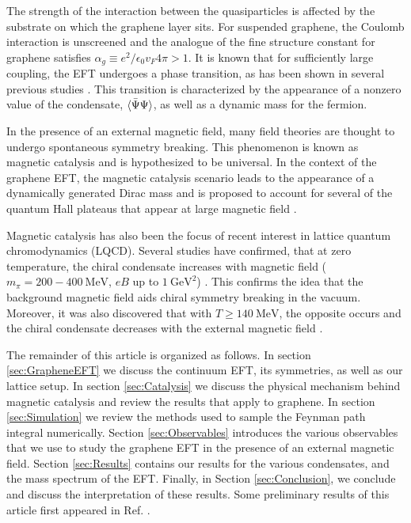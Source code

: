 \documentclass[aps,prd,twocolumn,showpacs,superscriptaddress,groupedaddress]{revtex4}  %
\begin{document}
The strength of the interaction between the quasiparticles is affected by the substrate on which the graphene layer sits. For suspended graphene, the Coulomb interaction is unscreened
and the analogue of the fine structure constant for graphene satisfies $\alpha_g \equiv e^2/\epsilon_0 v_F 4\pi > 1$. It is known that for sufficiently large coupling, the EFT undergoes a phase transition, as has been shown in 
several previous studies \cite{Drut1, Drut2, Hands1, Hands2}. This transition is characterized by the appearance of a nonzero value of the condensate, ${\langle {\bar \Psi} \Psi \rangle}$, as well as a dynamic mass
for the fermion.

In the presence of an external magnetic field, many field theories are thought to undergo spontaneous symmetry breaking. This phenomenon is known as magnetic catalysis and is hypothesized to be universal. In the context of the graphene EFT, the magnetic
catalysis scenario leads to the appearance of a dynamically generated Dirac mass and is proposed to account for several of the quantum Hall plateaus that appear at large magnetic field \cite{ZhangQHE,JiangQHE}.

Magnetic catalysis has also been the focus of recent interest in lattice quantum chromodynamics (LQCD). Several studies have confirmed, that at zero temperature, the chiral condensate
increases with magnetic field ($m_{\pi} = 200-400 ~\text{MeV}$, $eB$ up to $1 ~\text{GeV}^2$) \cite{Buividovich,Braguta}. This confirms the idea that the background magnetic field aids chiral symmetry breaking in the vacuum.
Moreover, it was also discovered that with $T \geq 140 ~\text{MeV}$, the opposite occurs and the chiral condensate decreases with the external magnetic field \cite{Bali1,Bali2}.

The remainder of this article is organized as follows. In section \ref{sec:GrapheneEFT} we discuss the continuum EFT, its symmetries, as well as our lattice setup.
In section \ref{sec:Catalysis} we discuss the physical mechanism behind magnetic catalysis and review the results that apply to graphene. In section \ref{sec:Simulation} we review the methods used to sample the Feynman path integral numerically. Section \ref{sec:Observables} introduces the various observables that we use to study the graphene EFT in the presence of an external magnetic field. Section \ref{sec:Results} contains our results for the various condensates, and the mass spectrum of the EFT.
Finally, in Section \ref{sec:Conclusion}, we conclude and discuss the interpretation of these results. Some preliminary results of this article first appeared in Ref. \cite{DPF2015}.
\end{document}
